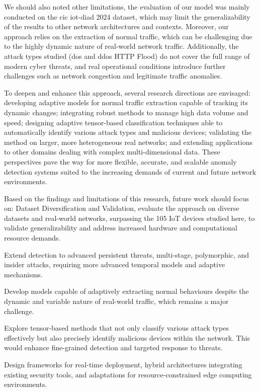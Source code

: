 \documentclass[preprint,12pt,authoryear]{elsarticle}
\begin{document}
We should also noted other limitations, the evaluation of our model was mainly conducted on the \gls{cic} \gls{iot}-\gls{diad} 2024 dataset, which may limit the generalizability of the results to other network architectures and contexts. Moreover, our approach relies on the extraction of normal traffic, which can be challenging due to the highly dynamic nature of real-world network traffic. Additionally, the attack types studied (\gls{dos} and \gls{ddos} \gls{HTTP} Flood) do not cover the full range of modern cyber threats, and real operational conditions introduce further challenges such as network congestion and legitimate traffic anomalies.

To deepen and enhance this approach, several research directions are envisaged: developing adaptive models for normal traffic extraction capable of tracking its dynamic changes; integrating robust methods to manage high data volume and speed; designing adaptive tensor-based classification techniques able to automatically identify various attack types and malicious devices; validating the method on larger, more heterogeneous real networks; and extending applications to other domains dealing with complex multi-dimensional data. These perspectives pave the way for more flexible, accurate, and scalable anomaly detection systems suited to the increasing demands of current and future network environments.

Based on the findings and limitations of this research, future work should focus on: Dataset Diversification and Validation, evaluate the approach on diverse datasets and real-world networks, surpassing the 105 IoT devices studied here, to validate generalizability and address increased hardware and computational resource demands.

\noindent Extend detection to advanced persistent threats, multi-stage, polymorphic, and insider attacks, requiring more advanced temporal models and adaptive mechanisms.
   
\noindent Develop models capable of adaptively extracting normal behaviours despite the dynamic and variable nature of real-world traffic, which remains a major challenge.
    

\noindent Explore tensor-based methods that not only classify various attack types effectively but also precisely identify malicious devices within the network. This would enhance fine-grained detection and targeted response to threats.
    
\noindent Design frameworks for real-time deployment, hybrid architectures integrating existing security tools, and adaptations for resource-constrained edge computing environments.
    
\end{document}
